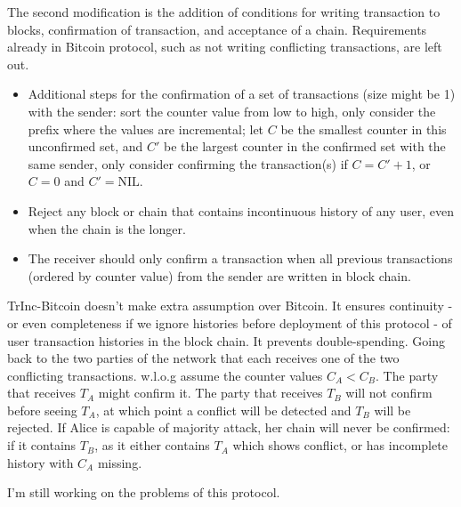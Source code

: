\documentclass[10pt]{article}
\begin{document}
The second modification is the addition of conditions for writing transaction
to blocks, confirmation of transaction, and acceptance of a chain. Requirements
already in Bitcoin protocol, such as not writing conflicting transactions, are
left out.

\begin{itemize}
    \item Additional steps for the confirmation of a set of transactions (size
    might be 1) with the sender: sort the counter value from low to high, only
    consider the prefix where the values are incremental; let $C$ be the
    smallest counter in this unconfirmed set, and $C'$ be the largest counter in
    the confirmed set with the same sender, only consider confirming the
    transaction(s) if $C = C' + 1$, or $C=0$ and $C'=\text{NIL}$.
    \item Reject any block or chain that contains incontinuous history of any
    user, even when the chain is the longer.
    \item The receiver should only confirm a transaction when all previous
    transactions (ordered by counter value) from the sender are written in block
    chain.
\end{itemize}

TrInc-Bitcoin doesn't make extra assumption over Bitcoin. It ensures continuity
- or even completeness if we ignore histories before deployment of this
protocol - of user transaction histories in the block chain. It prevents
double-spending. Going back to the two parties of the network that each receives
one of the two conflicting transactions. w.l.o.g assume the counter values
$C_A < C_B$. The party that receives $T_A$ might confirm it. The party that
receives $T_B$ will not confirm before seeing $T_A$, at which point a conflict
will be detected and $T_B$ will be rejected.
If Alice is capable of majority attack, her chain will never be confirmed: if it
contains $T_B$, as it either contains $T_A$ which shows conflict, or has
incomplete history with $C_A$ missing.

I'm still working on the problems of this protocol.
\end{document}
